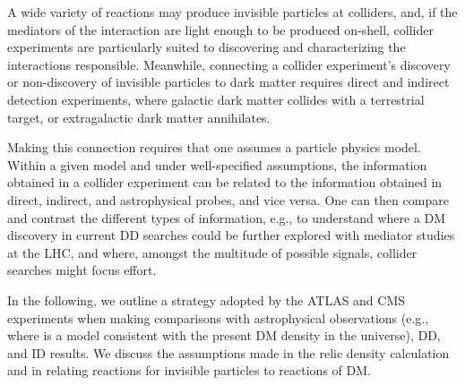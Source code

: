 A wide variety of reactions may produce invisible particles at colliders, and, if the mediators of the interaction are light enough to be produced on-shell, collider experiments are particularly suited to discovering and characterizing the interactions responsible.  Meanwhile, connecting a collider experiment's discovery or non-discovery of invisible particles to dark matter requires direct and indirect detection experiments, where galactic dark matter collides with a terrestrial target, or extragalactic dark matter annihilates.

Making this connection requires that one assumes a particle physics model.
Within a given model and under well-specified assumptions, the information obtained in a collider experiment can be related to the information obtained in direct, indirect, and astrophysical probes, and vice versa.
One can then compare and contrast the different types of information, e.g., to understand where a DM discovery in current DD searches could be further explored with mediator studies at the LHC, and where, amongst the multitude of possible signals, collider searches might focus effort.

In the following, we outline a strategy adopted by the ATLAS and CMS experiments when making comparisons with astrophysical observations (e.g., where is a model consistent with the present DM density in the universe), DD, and ID results. We discuss the assumptions made in the relic density calculation and in relating reactions for invisible particles to reactions of DM.




